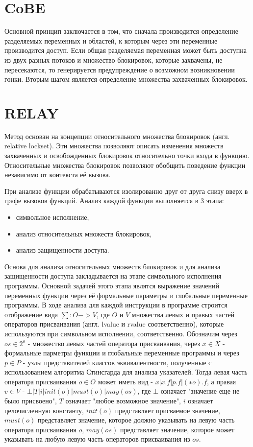 \section{CoBE}

Основной принцип заключается в том, что сначала производится определение разделяемых переменных и областей, к которым через эти переменные производится доступ. Если общая разделяемая переменная может быть доступна из двух разных потоков и множество блокировок, которые захвачены, не пересекаются, то генерируется предупреждение о возможном возникновении гонки. Вторым шагом является определение множества захваченных блокировок.

\section{RELAY}

Метод основан на концепции относительного множества блокировок (англ. relative lockset). Эти множества позволяют описать изменения множеств захваченных и освобожденных блокировок относительно точки входа в функцию. Относительные множества блокировок позволяют обобщить поведение функции независимо от контекста её вызова.

При анализе функции обрабатываются изолированно друг от друга снизу вверх в графе вызовов функций. Анализ каждой функции выполняется в 3 этапа:
\begin{itemize}
\item символьное исполнение,
\item анализ относительных множеств блокировок,
\item анализ защищенности доступа.
\end{itemize}

Основа для анализа относительных множеств блокировок и для анализа защищенности доступа закладывается на этапе символьного исполнения программы. Основной задачей этого этапа являтся выражение значений переменных функции через её формальные параметры и глобальные переменные программы. В ходе анализа для каждой инструкции в программе строится отображение вида $\sum: O->V$, где $O$ и $V$ множества левых и правых частей операторов присваивания (англ. lvalue и rvalue соответственно), которые используются при символьном исполнении, соответственно. Обозначим через $os \in 2^{o}$ - множество левых частей оператора присваивания, через $x \in X$ - формальные парметры функции и глобальные переменные программы и через $p \in P$ - узлы представителей классов эквивалентности, полученные с использованием алгоритма Стинсгарда для анализа указателей. Тогда левая часть оператора присваивания $o \in O$ может иметь вид - $x | x.f | p.f | (∗o).f$, а правая $v \in V$ - $⊥ | T | i | init(o) | must(o) | may(os)$, где $⊥$ означает "значение еще не было присвоено", $T$ означает "любое возможное значение", $i$ означает целочисленную константу, $init(o)$ представляет присваемое значение, $must(o)$ представляет значение, которое должно указывать на левую часть оператора присваивания $o$, $may(os)$ представляет значение, которое может указывать на любую левую часть операторов присваивания из $os$.

